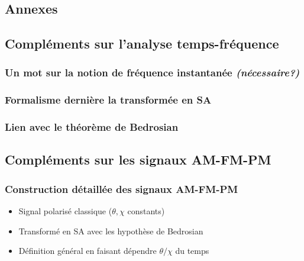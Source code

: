 


\begin{annexe}

\section{Annexes}

\subsection{Compléments sur l'analyse temps-fréquence}\label{ann:complement_t-f}

\subsubsection{Un mot sur la notion de fréquence instantanée \textit{(nécessaire?)}}\label{ann:freq_instant}

\subsubsection{Formalisme dernière la transformée en SA}\label{ann:transfo_SA}

\subsubsection{Lien avec le théorème de Bedrosian}\label{ann:bedrosian}

\subsection{Compléments sur les signaux AM-FM-PM}\label{ann:AM-FM-PM}

\subsubsection{Construction détaillée des signaux AM-FM-PM }\label{ann:construc_AM-FM-PM}

\begin{itemize}
	
	\item Signal polarisé classique ($\theta,\chi$ constants)
	
	\item Transformé en SA avec les hypothèse de Bedrosian 
	
	\item Définition général en faisant dépendre $\theta / \chi$ du temps
	

\end{itemize}
\end{annexe}
